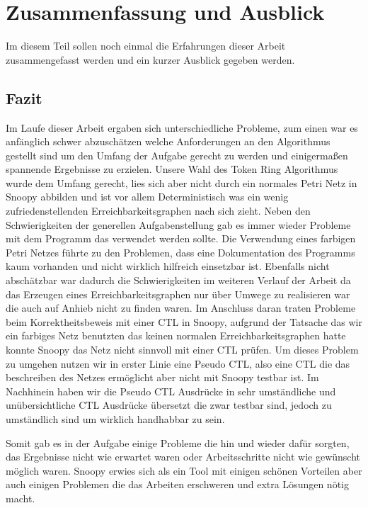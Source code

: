 \section{Zusammenfassung und Ausblick} 
Im diesem Teil sollen noch einmal die Erfahrungen dieser Arbeit zusammengefasst werden und ein kurzer Ausblick gegeben werden.

\subsection{Fazit}
Im Laufe dieser Arbeit ergaben sich unterschiedliche Probleme, zum einen war es anfänglich schwer abzuschätzen welche Anforderungen an den Algorithmus gestellt sind um den Umfang der Aufgabe gerecht zu werden und einigermaßen spannende Ergebnisse zu erzielen. Unsere Wahl des Token Ring Algorithmus wurde dem Umfang gerecht, lies sich aber nicht durch ein normales Petri Netz in Snoopy abbilden und ist vor allem Deterministisch was ein wenig zufriedenstellenden Erreichbarkeitsgraphen nach sich zieht. Neben den Schwierigkeiten der generellen Aufgabenstellung gab es immer wieder Probleme mit dem Programm das verwendet werden sollte. Die Verwendung eines farbigen Petri Netzes führte zu den Problemen, dass eine Dokumentation des Programms kaum vorhanden und nicht wirklich hilfreich einsetzbar ist. Ebenfalls nicht abschätzbar war dadurch die Schwierigkeiten im weiteren Verlauf der Arbeit da das Erzeugen eines Erreichbarkeitsgraphen nur über Umwege zu realisieren war die auch auf Anhieb nicht zu finden waren. Im Anschluss daran traten Probleme beim Korrektheitsbeweis mit einer CTL in Snoopy, aufgrund der Tatsache das wir ein farbiges Netz benutzten das keinen normalen Erreichbarkeitsgraphen hatte konnte Snoopy das Netz nicht sinnvoll mit einer CTL prüfen. Um dieses Problem zu umgehen nutzen wir in erster Linie eine Pseudo CTL, also eine CTL die das beschreiben des Netzes ermöglicht aber nicht mit Snoopy testbar ist. Im Nachhinein haben wir die Pseudo CTL Ausdrücke in sehr umständliche und unübersichtliche CTL Ausdrücke übersetzt die zwar testbar sind, jedoch zu umständlich sind um wirklich handhabbar zu sein.

Somit gab es in der Aufgabe einige Probleme die hin und wieder dafür sorgten, das Ergebnisse nicht wie erwartet waren oder Arbeitsschritte nicht wie gewünscht möglich waren. Snoopy erwies sich als ein Tool mit einigen schönen Vorteilen aber auch einigen Problemen die das Arbeiten erschweren und extra Lösungen nötig macht.

